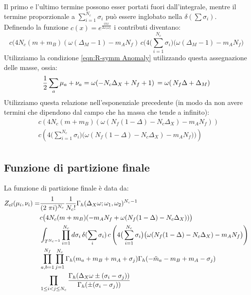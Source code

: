 \documentclass[a4paper,12pt]{article}
\begin{document}
Il primo e l'ultimo termine possono esser portati fuori dall'integrale, mentre il termine proporzionale a $ \sum_{i=1}^{N_c}	\sigma_i  $ può essere inglobato nella $\delta( \sum \sigma_i)$.\\
Definendo la funzione $ c(x) = e^{ \frac{i \pi x }{2 \omega_1 \omega_2}}$ i contributi diventano:
$$
c( 4 N_c  ( m  + m_B ) ( \omega (\Delta_M - 1) -  m_A N_f )\,  c( 4\big( \sum_{i=1}^{N_c}	 \sigma_i  \big) \big (\omega (\Delta_M - 1) -  m_A N_f \big)
$$
Utilizziamo la condizione \ref{eqn:R-symm Anomaly} utilizzando questa assegnazione delle masse, ossia:
\begin{equation}
  { 1 \over 2 } \sum_a \mu_a + \nu_a  = \omega ( -N_c \Delta_X + N_f + 1 )  \, =\omega( \, N_f \Delta +  \Delta_M )
\end{equation}
Utilizziamo questa relazione nell'esponenziale precedente (in modo da non avere termini che dipendono dal campo che ha massa che tende a infinito):
\begin{align*}
&c \left( 4 N_c  ( m  + m_B ) ( \omega ( N_f (1 - \Delta)  - N_c \Delta_X ) -  m_A N_f )\right)\,  \\
&c\left( 4\big( \sum_{i=1}^{N_c}	 \sigma_i  \big) \big ( \omega( N_f (1 - \Delta)  - N_c \Delta_X)  -  m_A N_f ) \big) \right)\\
\end{align*}



\subsection{Funzione di partizione finale}
La funzione di partizione finale è data da:
\begin{align*}
 Z_{el} ( \mu_i , \nu_i ) = &
 \frac{1}{ (2 \ \pi i)^{N_c} }{1 \over N_c ! }
\Gamma_h ( \Delta_X \omega ; \omega_1 , \omega_2)^{N_c-1} \\
& c \big( 4 N_c  ( m  + m_B ) (-  m_A N_f   + \omega ( N_f (1 - \Delta)  - N_c \Delta_X ) ) \big) \\
&\int_{T^{N_c-1}}
\prod_{i=1}^{N_c} d \sigma_i \, \delta( \sum_i \sigma_i) \,  c \left( 4\big( \sum_{i=1}^{N_c}	 \sigma_i  \big) \big( \omega( N_f (1 - \Delta)  - N_c \Delta_X)  -  m_A N_f \big) \right)\\
& \prod_{a,b=1}^{N_f} \prod_{j=1}^{N_c} \Gamma_h ( m_a + m_B + m_A + \sigma_j) \Gamma_h ( -\tilde{m}_a -m_B + m_A - \sigma_j)\\
 &  \prod_{ 1 \leq i<j \leq N_c} \frac{ \Gamma_h( \Delta_X \omega \pm (\sigma_i - \sigma_j)) }{ \Gamma_h ( \pm (\sigma_i - \sigma_j) )}
 \end{align*}
\end{document}
